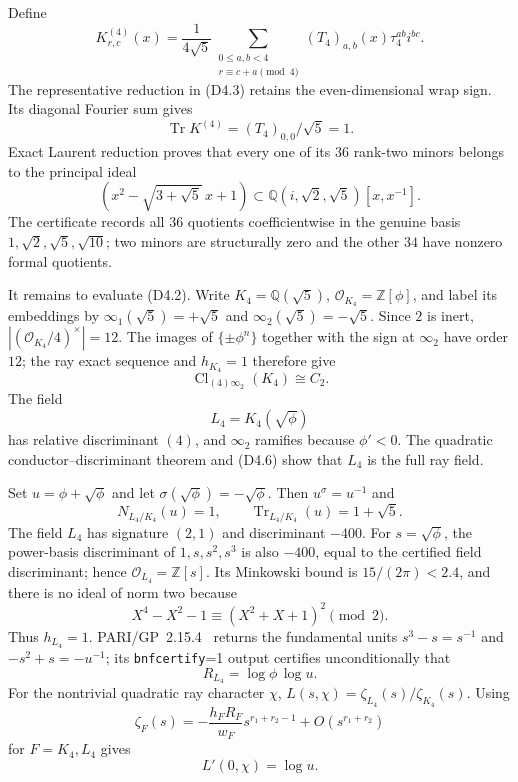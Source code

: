 \documentclass[11pt]{article}
\newcommand{\Cl}{\operatorname{Cl}}
\newcommand{\Tr}{\operatorname{Tr}}
\newcommand{\Q}{\mathbb Q}
\newcommand{\Z}{\mathbb Z}
\begin{document}
Define
\[
 K^{(4)}_{r,c}(x)=\frac1{4\sqrt5}
 \sum_{\substack{0\le a,b<4\\r\equiv c+a\pmod4}}
 (T_4)_{a,b}(x)\tau_4^{ab}i^{bc}.
\tag{D4.3}
\]
The representative reduction in (D4.3) retains the even-dimensional
wrap sign.  Its diagonal Fourier sum gives
\[
 \Tr K^{(4)}=(T_4)_{0,0}/\sqrt5=1.
\tag{D4.4}
\]
Exact Laurent reduction proves that every one of its $36$ rank-two
minors belongs to the principal ideal
\[
 \left(x^2-\sqrt{3+\sqrt5}\,x+1\right)
 \subset\Q(i,\sqrt2,\sqrt5)[x,x^{-1}].
\tag{D4.5}
\]
The certificate records all $36$ quotients coefficientwise in the
genuine basis $1,\sqrt2,\sqrt5,\sqrt{10}$; two minors are structurally
zero and the other $34$ have nonzero formal quotients.

It remains to evaluate (D4.2).  Write $K_4=\Q(\sqrt5)$,
$\mathcal O_{K_4}=\Z[\phi]$, and label its embeddings by
$\infty_1(\sqrt5)=+\sqrt5$ and $\infty_2(\sqrt5)=-\sqrt5$.
Since $2$ is inert,
$|(\mathcal O_{K_4}/4)^\times|=12$.  The images of
$\{\pm\phi^n\}$ together with the sign at $\infty_2$ have order $12$;
the ray exact sequence and $h_{K_4}=1$ therefore give
\[
 \Cl_{(4)\infty_2}(K_4)\cong C_2.
\tag{D4.6}
\]
The field
\[
 L_4=K_4(\sqrt\phi)
\]
has relative discriminant $(4)$, and $\infty_2$ ramifies because
$\phi'<0$.  The quadratic conductor--discriminant theorem and
\textup{(D4.6)} show that $L_4$ is the full ray field.

Set $u=\phi+\sqrt\phi$ and let
$\sigma(\sqrt\phi)=-\sqrt\phi$.  Then
$u^\sigma=u^{-1}$ and
\[
 N_{L_4/K_4}(u)=1,\qquad \Tr_{L_4/K_4}(u)=1+\sqrt5.
\]
The field $L_4$ has signature $(2,1)$ and discriminant $-400$.
For $s=\sqrt\phi$, the power-basis discriminant of
$1,s,s^2,s^3$ is also $-400$, equal to the certified field
discriminant; hence $\mathcal O_{L_4}=\Z[s]$.  Its Minkowski bound is
$15/(2\pi)<2.4$, and there is no ideal of norm two because
\[
 X^4-X^2-1\equiv(X^2+X+1)^2\pmod2.
\]
Thus $h_{L_4}=1$.  PARI/GP~2.15.4~\cite{PARI} returns the fundamental units
$s^3-s=s^{-1}$ and $-s^2+s=-u^{-1}$; its
\texttt{bnfcertify}=1 output certifies unconditionally that
\[
 R_{L_4}=\log\phi\,\log u.
\]
For the nontrivial quadratic ray character $\chi$,
$L(s,\chi)=\zeta_{L_4}(s)/\zeta_{K_4}(s)$.  Using
\[
 \zeta_F(s)=-\frac{h_FR_F}{w_F}s^{r_1+r_2-1}
 +O(s^{r_1+r_2})
\]
for $F=K_4,L_4$ gives
\[
 L'(0,\chi)=\log u.
\tag{D4.7}
\]
\end{document}
